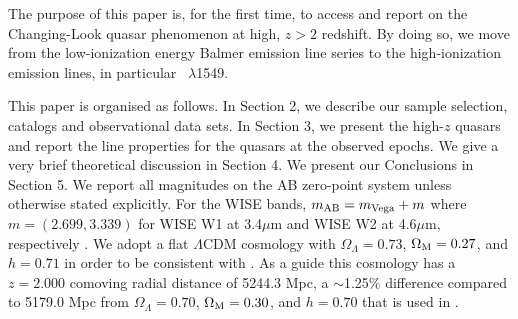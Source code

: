 \documentclass[a4paper,fleqn,usenatbib]{mnras}
\begin{document}
The purpose of this paper is, for the first time, to access and 
report on the Changing-Look quasar phenomenon at high, 
$z>2$ redshift. By doing so, we move from the low-ionization 
energy Balmer emission line series to the high-ionization emission 
lines, in particular \civ\ $\lambda$1549. 

This paper is organised as follows. In Section 2, we describe our
sample selection, catalogs and observational data sets.  In Section 3,
we present the high-$z$ quasars and report the line properties for the
quasars at the observed epochs.  We give a very brief theoretical
discussion in Section 4. We present our Conclusions in Section 5.  We
report all magnitudes on the AB zero-point system \citep{Oke_Gunn1983,
Fukugita1996} unless otherwise stated explicitly. For the WISE bands,
$m_{\rm AB} = m_{\rm Vega} + m$ where $m = (2.699, 3.339)$ for WISE W1
at 3.4$\mu$m and WISE W2 at 4.6$\mu$m, respectively
\citep{Cutri2011}.
We adopt a flat $\Lambda$CDM cosmology with $\Omega_{\Lambda} = 0.73$,
$\Omega_{\rm M} = 0.27$, and $h = 0.71$ in order to be consistent with
\citet{Hamann2017}. As a guide this cosmology has a $z=2.000$
comoving radial distance of 5244.3 Mpc, a $\sim$1.25\% difference
compared to 5179.0 Mpc from $\Omega_{\Lambda} = 0.70$, $\Omega_{\rm M}
= 0.30$, and $h = 0.70$ that is used in \citet{Shen2011}.
\end{document}
